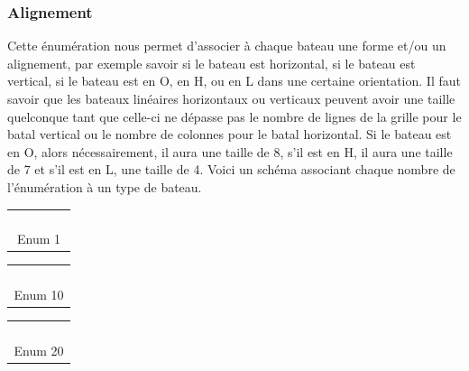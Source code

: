 \subsubsection{Alignement}
Cette énumération nous permet d'associer à chaque bateau une forme et/ou un alignement, par exemple savoir si le bateau est horizontal, si le bateau est vertical, si le bateau est en O, en H, ou en L dans une certaine orientation. Il faut savoir que les bateaux linéaires horizontaux ou verticaux peuvent avoir une taille quelconque tant que celle-ci ne dépasse pas le nombre de lignes de la grille pour le batal vertical ou le nombre de colonnes pour le batal horizontal. Si le bateau est en O, alors nécessairement, il aura une taille de 8, s'il est en H, il aura une taille de 7 et s'il est en L, une taille de 4. Voici un schéma associant chaque nombre de l'énumération à un type de bateau. 
\begin{flushleft}
\begin{tabular}[t]{|c|c|c|c|c|}
  \hline
  & & & &  \\
  \hline
  & & & &  \\
  \hline
  & \cellcolor{blue} & \cellcolor{blue} & \cellcolor{blue} &   \\
  \hline
  & & & &  \\
  \hline
  & & & &  \\
  \hline
  \multicolumn{5}{c}{Enum 1}\\
\end{tabular}
\hspace{3cm}
\begin{tabular}[t]{|c|c|c|c|c|}
  \hline
  & & & &  \\
  \hline
  & & \cellcolor{blue} & &  \\
  \hline
  & & \cellcolor{blue} & &  \\
  \hline
  & & \cellcolor{blue} & &  \\
  \hline
  & & & &  \\
  \hline
  \multicolumn{5}{c}{Enum 10}\\
\end{tabular}
\hspace{3cm}
\begin{tabular}[t]{|c|c|c|c|c|}
  \hline
  & & & &  \\
  \hline
  & \cellcolor{blue}& \cellcolor{blue}& \cellcolor{blue}&  \\
  \hline
  & \cellcolor{blue}& & \cellcolor{blue}&  \\
  \hline
  & \cellcolor{blue}& \cellcolor{blue}& \cellcolor{blue}&  \\
  \hline
  & & & &  \\
  \hline
  \multicolumn{5}{c}{Enum 20}\\
\end{tabular}
\end{flushleft}
